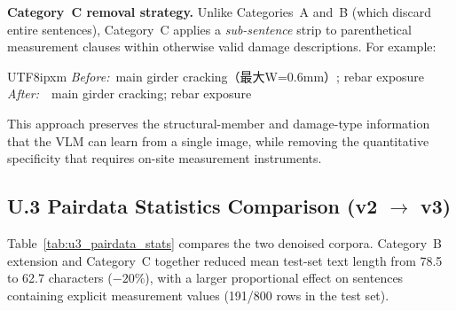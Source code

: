 \documentclass[onecolumn]{article}
\begin{document}
\noindent\textbf{Category~C removal strategy.}
Unlike Categories~A and~B (which discard entire sentences),
Category~C applies a \emph{sub-sentence} strip to parenthetical
measurement clauses within otherwise valid damage descriptions.
For example:

\begin{center}
\small
\begin{CJK}{UTF8}{ipxm}
\textit{Before:}~main girder cracking（最大W=0.6mm）; rebar exposure \\[2pt]
\textit{After:}~~main girder cracking; rebar exposure
\end{CJK}
\end{center}

\noindent
This approach preserves the structural-member and damage-type information
that the VLM can learn from a single image, while removing the
quantitative specificity that requires on-site measurement instruments.

\subsection*{U.3 Pairdata Statistics Comparison (v2 $\to$ v3)}
\label{sec:u3_pairdata_stats}

Table~\ref{tab:u3_pairdata_stats} compares the two denoised corpora.
Category~B extension and Category~C together reduced mean test-set text length
from 78.5 to 62.7 characters ($-20\%$), with a larger proportional effect
on sentences containing explicit measurement values (191/800 rows in the test set).
\end{document}
